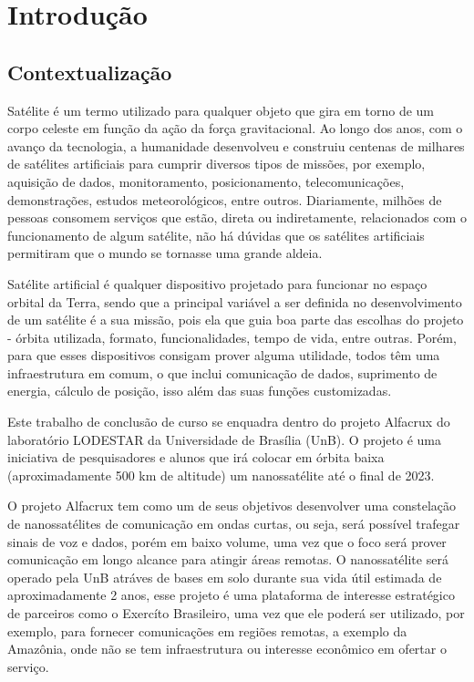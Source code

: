 \chapter{Introdução} \label{introducao}
\section{Contextualização}
Satélite é um termo utilizado para qualquer objeto que gira em torno de um corpo celeste em função da ação da força gravitacional. Ao longo dos anos, com o avanço da tecnologia, a humanidade desenvolveu e construiu centenas de milhares de satélites artificiais para cumprir diversos tipos de missões, por exemplo, aquisição de dados, monitoramento, posicionamento, telecomunicações, demonstrações, estudos meteorológicos, entre outros. Diariamente, milhões de pessoas consomem serviços que estão, direta ou indiretamente, relacionados com o funcionamento de algum satélite, não há dúvidas que os satélites artificiais permitiram que o mundo se tornasse uma grande aldeia.

Satélite artificial é qualquer dispositivo projetado para funcionar no espaço orbital da Terra, sendo que a principal variável a ser definida no desenvolvimento de um satélite é a sua missão, pois ela que guia boa parte das escolhas do projeto - órbita utilizada, formato, funcionalidades, tempo de vida, entre outras. Porém, para que esses dispositivos consigam prover alguma utilidade, todos têm uma infraestrutura em comum, o que inclui comunicação de dados, suprimento de energia, cálculo de posição, isso além das suas funções customizadas.\cite{nasa_comms_article} 

Este trabalho de conclusão de curso se enquadra dentro do projeto Alfacrux do laboratório LODESTAR da Universidade de Brasília (UnB). O projeto é uma iniciativa de pesquisadores e alunos que irá colocar em órbita baixa (aproximadamente 500 km de altitude) um nanossatélite até o final de 2023.

O projeto Alfacrux tem como um de seus objetivos desenvolver uma constelação de nanossatélites de comunicação em ondas curtas, ou seja, será possível trafegar sinais de voz e dados, porém em baixo volume, uma vez que o foco será prover comunicação em longo alcance para atingir áreas remotas. O nanossatélite será operado pela UnB atráves de bases em solo durante sua vida útil estimada de aproximadamente 2 anos, esse projeto é uma plataforma de interesse estratégico de parceiros como o Exercíto Brasileiro, uma vez que ele poderá ser utilizado, por exemplo, para fornecer comunicações em regiões remotas, a exemplo da Amazônia, onde não se tem infraestrutura ou interesse econômico em ofertar o serviço. 


